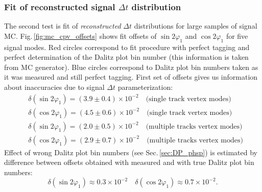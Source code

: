 \documentclass[preprint,aps,showpacs]{revtex4}
\newcommand{\dt}{\ensuremath{\Delta t}\xspace}
\newcommand{\sindbeta}{\ensuremath{\sin{2\varphi_1}}\xspace}
\newcommand{\cosdbeta}{\ensuremath{\cos{2\varphi_1}}\xspace}
\begin{document}
\subsubsection{Fit of reconstructed signal \dt distribution}\label{sec:mc_cpv_signal_mc}
The second test is fit of {\it reconstructed} \dt distributions for large samples of signal MC. Fig.\,\ref{fig:mc_cpv_offsets} shows fit offsets of \sindbeta and \cosdbeta for five signal modes. Red circles correspond to fit procedure with perfect tagging and perfect determination of the Dalitz plot bin number (this information is taken from MC generator). Blue circles correspond to Dalitz plot bin numbers taken as it was measured and still perfect tagging. First set of offsets gives us information about inaccuracies due to signal \dt parameterization:
\begin{equation}
\begin{split}
 &\delta(\sindbeta) = (3.9 \pm 0.4)\times10^{-2}\quad\text{(single track vertex modes)}\\
 &\delta(\cosdbeta) = (4.5 \pm 0.6)\times10^{-2}\quad\text{(single track vertex modes)}\\
 &\delta(\sindbeta) = (2.0 \pm 0.5)\times10^{-2}\quad\text{(multiple tracks vertex modes)}\\
 &\delta(\cosdbeta) = (2.9 \pm 0.7)\times10^{-2}\quad\text{(multiple tracks vertex modes)}
\end{split}
\end{equation}
Effect of wrong Dalitz plot bin numbers (see Sec.\,\ref{sec:DP_phsp}) is estimated by difference between offsets obtained with measured and with true Dalitz plot bin numbers:
\begin{equation}
 \delta(\sindbeta) \approx 0.3\times10^{-2}\quad \delta(\cosdbeta) \approx 0.7\times10^{-2}.
\end{equation}
\end{document}
